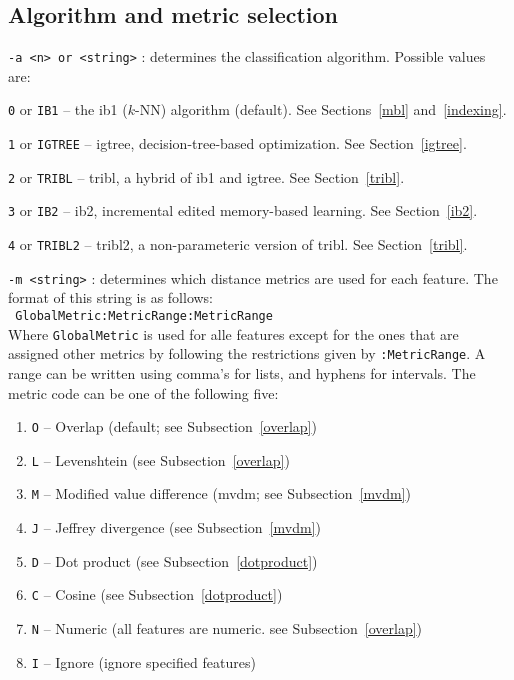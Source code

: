 \documentclass{report}
\begin{document}
\subsection{Algorithm and metric selection}

\begin{description}

\item {\tt -a <n> or <string>} : determines the classification
algorithm. Possible values are:

	\begin{description}
	\item {\tt 0} or {\tt IB1} -- the {\sc ib1} ($k$-NN) algorithm (default). See Sections~\ref{mbl} and~\ref{indexing}.
	\item {\tt 1} or {\tt IGTREE} -- {\sc igtree}, decision-tree-based optimization. See Section~\ref{igtree}.
	\item {\tt 2} or {\tt TRIBL} -- {\sc tribl}, a hybrid of {\sc ib1} and {\sc igtree}. See Section~\ref{tribl}.
	\item {\tt 3} or {\tt IB2} -- {\sc ib2}, incremental edited memory-based learning. See Section~\ref{ib2}.
	\item {\tt 4} or {\tt TRIBL2} -- {\sc tribl2}, a non-parameteric version of {\sc tribl}. See Section~\ref{tribl}.
	\end{description}

\item {\tt -m <string>} : determines which distance metrics are used
for each feature. The format of this string is as follows:\\ {\tt
GlobalMetric:MetricRange:MetricRange}\\ Where {\tt GlobalMetric} is
used for alle features except for the ones that are assigned other
metrics by following the restrictions given by {\tt :MetricRange}.  A
range can be written using comma's for lists, and hyphens for
intervals. The metric code can be one of the following five:

\begin{enumerate}
\item {\tt O} -- Overlap (default; see Subsection~\ref{overlap})
\item {\tt L} -- Levenshtein (see Subsection~\ref{overlap})
\item {\tt M} -- Modified value difference ({\sc mvdm}; see Subsection~\ref{mvdm})
\item {\tt J} -- Jeffrey divergence (see Subsection~\ref{mvdm})
\item {\tt D} -- Dot product (see Subsection~\ref{dotproduct})
\item {\tt C} -- Cosine (see Subsection~\ref{dotproduct})
\item {\tt N} -- Numeric (all features are numeric. see Subsection~\ref{overlap})
\item {\tt I} -- Ignore (ignore specified features)
\end{enumerate}


\end{description}
\end{document}
